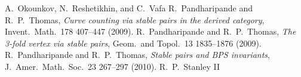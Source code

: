 \documentclass[12pt]{amsart}
\theoremstyle{definition}
\theoremstyle{property}
\renewcommand\_{^{}_}
\begin{document}
\begin{thebibliography}{MNOP2}
 A.~Okounkov, N.~Reshetikhin, and C.~Vafa
 R.~Pandharipande and R.~P.~Thomas, \textit{Curve counting via stable pairs in the derived category}, Invent.~Math.~178 407--447 (2009). %
 R.~Pandharipande and R.~P.~Thomas, \textit{The 3-fold vertex via stable pairs}, Geom.~and Topol.~13 1835--1876 (2009).
 R.~Pandharipande and R.~P.~Thomas, \textit{Stable pairs and BPS invariants}, J.~Amer.~Math.~Soc.~23 267--297 (2010). %
 R.~P.~Stanley II
\end{thebibliography}
\end{document}
